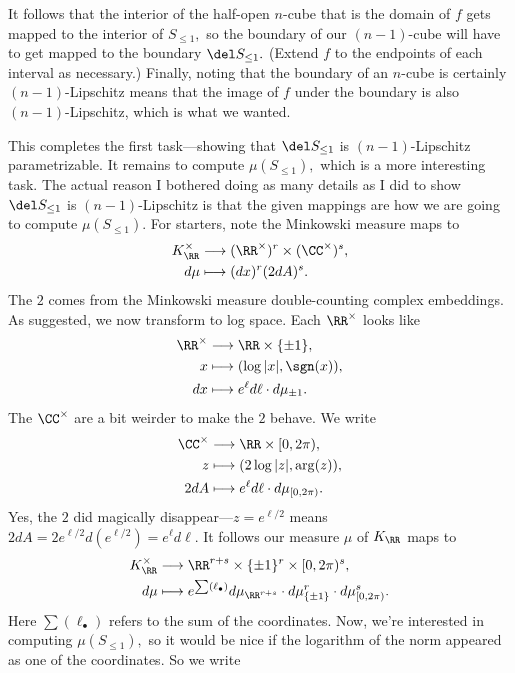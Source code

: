 It follows that the interior of the half-open $n$-cube that is the domain of $f$ gets mapped to the interior of $S_{\le1},$ so the boundary of our $(n-1)$-cube will have to get mapped to the boundary $\del S_{\le1}.$ (Extend $f$ to the endpoints of each interval as necessary.) Finally, noting that the boundary of an $n$-cube is certainly $(n-1)$-Lipschitz means that the image of $f$ under the boundary is also $(n-1)$-Lipschitz, which is what we wanted.

This completes the first task---showing that $\del S_{\le1}$ is $(n-1)$-Lipschitz parametrizable. It remains to compute $\mu(S_{\le1}),$ which is a more interesting task. The actual reason I bothered doing as many details as I did to show $\del S_{\le1}$ is $(n-1)$-Lipschitz is that the given mappings are how we are going to compute $\mu(S_{\le1}).$ For starters, note the Minkowski measure maps to
\begin{align*}
    K_\RR^\times &\longrightarrow (\RR^\times)^r\times(\CC^\times)^s, \\
    d\mu &\longmapsto (dx)^r(2dA)^s.
\end{align*}
The $2$ comes from the Minkowski measure double-counting complex embeddings. As suggested, we now transform to log space. Each $\RR^\times$ looks like
\begin{align*}
    \RR^\times &\longrightarrow \RR \times \{\pm1\}, \\
    x & \longmapsto (\log|x|,\sgn(x)), \\
    dx & \longmapsto e^\ell d\ell\cdot d\mu_{\pm1}.
\end{align*}
The $\CC^\times$ are a bit weirder to make the $2$ behave. We write
\begin{align*}
    \CC^\times &\longrightarrow \RR \times [0,2\pi), \\
    z & \longmapsto (2\log|z|,\arg(z)), \\
    2dA & \longmapsto e^\ell d\ell\cdot d\mu_{[0,2\pi)}.
\end{align*}
Yes, the $2$ did magically disappear---$z=e^{\ell/2}$ means $2dA=2e^{\ell/2}d\left(e^{\ell/2}\right)=e^\ell d\ell.$ It follows our measure $\mu$ of $K_\RR$ maps to
\begin{align*}
    K_\RR^\times &\longrightarrow \RR^{r+s}\times\{\pm1\}^r\times[0,2\pi)^s, \\
    d\mu &\longmapsto e^{\sum(\ell_\bullet)}d\mu_{\RR^{r+s}}\cdot d\mu_{\{\pm1\}}^r\cdot d\mu_{[0,2\pi)}^s.
\end{align*}
Here $\sum(\ell_\bullet)$ refers to the sum of the coordinates. Now, we're interested in computing $\mu(S_{\le1}),$ so it would be nice if the logarithm of the norm appeared as one of the coordinates. So we write
